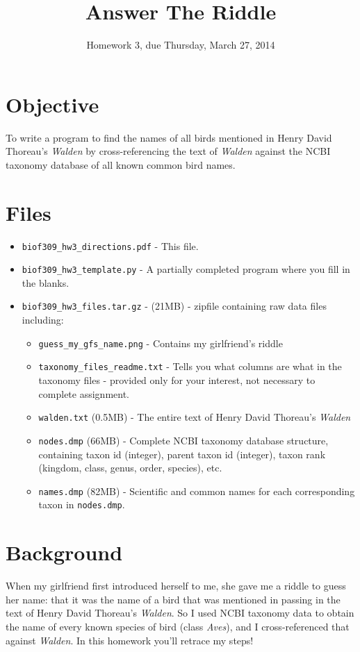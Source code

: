 \documentclass[11pt]{amsart}
\title{Answer The Riddle}
\author{Homework 3, due Thursday, March 27, 2014}
\begin{document}
\maketitle

\section*{Objective}
To write a program to find the names of all birds mentioned in Henry David Thoreau's \textit{Walden} by cross-referencing the text of \textit{Walden} against the NCBI taxonomy database of all known common bird names.

\section*{Files}
\begin{itemize}
  \item \texttt{biof309_hw3_directions.pdf} - This file.
  \item \texttt{biof309_hw3_template.py} -  A partially completed program where you fill in the blanks.
  \item \texttt{biof309_hw3_files.tar.gz} - (21MB) - zipfile containing raw data files including:
  \begin{itemize}
    \item \texttt{guess_my_gfs_name.png} - Contains my girlfriend's riddle
    \item \texttt{taxonomy_files_readme.txt} - Tells you what columns are what in the taxonomy files - provided only for your interest, not necessary to complete assignment.
    \item \texttt{walden.txt} (0.5MB) - The entire text of Henry David Thoreau's \textit{Walden}
    \item \texttt{nodes.dmp} (66MB) - Complete NCBI taxonomy database structure, containing taxon id (integer), parent taxon id (integer), taxon rank (kingdom, class, genus, order, species), etc.
    \item \texttt{names.dmp} (82MB) - Scientific and common names for each corresponding taxon in \texttt{nodes.dmp}.
  \end{itemize}
\end{itemize}

\section*{Background}
When my girlfriend first introduced herself to me, she gave me a riddle to guess her name: that it was the name of a bird that was mentioned in passing in the text of Henry David Thoreau's \textit{Walden}. So I used NCBI taxonomy data to obtain the name of every known species of bird (class \textit{Aves}), and I cross-referenced that against \textit{Walden}. In this homework you'll retrace my steps!
\end{document}
